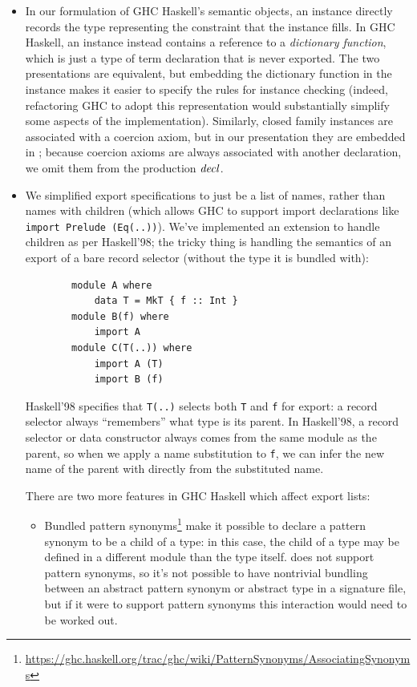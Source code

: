 \begin{itemize}
    \item In our formulation of GHC Haskell's semantic objects, an
    instance directly records the type representing the constraint that
    the instance fills.  In GHC Haskell, an instance instead contains a
    reference to a \emph{dictionary function}, which is just a type of
    term declaration that is never exported.  The two presentations are
    equivalent, but embedding the dictionary function in the instance
    makes it easier to specify the rules for instance checking (indeed,
    refactoring GHC to adopt this representation would substantially
    simplify some aspects of the implementation).  Similarly,
    closed family instances are associated with a coercion axiom, but in
    our presentation they are embedded in ; because coercion axioms
    are always associated with another declaration, we omit them from the
    production $\mathit{decl}$.

    \item We simplified export specifications to just be a list of
    names, rather than names with children (which allows GHC to support
    import declarations like \verb|import Prelude (Eq(..))|).  We've
    implemented an extension to handle children as per Haskell'98; the
    tricky thing is handling the semantics of an export of a bare
    record selector (without the type it is bundled with):

    \begin{lstlisting}
        module A where
            data T = MkT { f :: Int }
        module B(f) where
            import A
        module C(T(..)) where
            import A (T)
            import B (f)
    \end{lstlisting}

    Haskell'98 specifies that \verb|T(..)| selects both \verb|T| and \verb|f|
    for export: a record selector always ``remembers'' what type is its
    parent.  In Haskell'98, a record selector or data constructor
    always comes from the same module as the parent, so when
    we apply a name substitution to \verb|f|, we can infer the new name of
    the parent with directly from the substituted name.

    There are two more features in GHC Haskell which affect export lists:
    \begin{itemize}

        \item Bundled pattern synonyms\footnote{\url{https://ghc.haskell.org/trac/ghc/wiki/PatternSynonyms/AssociatingSynonyms}} make it possible to declare a pattern synonym
            to be a child of a type: in this case, the child of a type may
            be defined in a different module than the type itself.
            \Backpack{} does not support pattern synonyms, so it's
            not possible to have nontrivial bundling between an abstract
            pattern synonym or abstract type in a signature file, but if it
            were to support pattern synonyms this interaction would need to
            be worked out.


\end{itemize}
\end{itemize}
